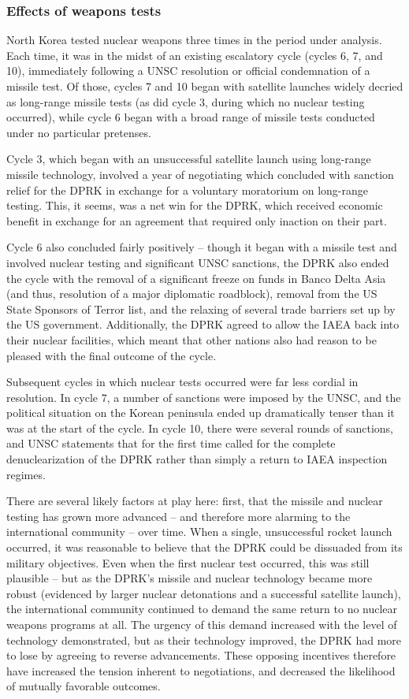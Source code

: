 \documentclass{article}
\begin{document}
\subsubsection{Effects of weapons tests}
North Korea tested nuclear weapons three times in the period under analysis. Each time, it was in the midst of an existing escalatory cycle (cycles 6, 7, and 10), immediately following a UNSC resolution or official condemnation of a missile test. Of those, cycles 7 and 10 began with satellite launches widely decried as long-range missile tests (as did cycle 3, during which no nuclear testing occurred), while cycle 6 began with a broad range of missile tests conducted under no particular pretenses.

Cycle 3, which began with an unsuccessful satellite launch using long-range missile technology, involved a year of negotiating which concluded with sanction relief for the DPRK in exchange for a voluntary moratorium on long-range testing. This, it seems, was a net win for the DPRK, which received economic benefit in exchange for an agreement that required only inaction on their part.

Cycle 6 also concluded fairly positively – though it began with a missile test and involved nuclear testing and significant UNSC sanctions, the DPRK also ended the cycle with the removal of a significant freeze on funds in Banco Delta Asia (and thus, resolution of a major diplomatic roadblock), removal from the US State Sponsors of Terror list, and the relaxing of several trade barriers set up by the US government. Additionally, the DPRK agreed to allow the IAEA back into their nuclear facilities, which meant that other nations also had reason to be pleased with the final outcome of the cycle.

Subsequent cycles in which nuclear tests occurred were far less cordial in resolution. In cycle 7, a number of sanctions were imposed by the UNSC, and the political situation on the Korean peninsula ended up dramatically tenser than it was at the start of the cycle. In cycle 10, there were several rounds of sanctions, and UNSC statements that for the first time called for the complete denuclearization of the DPRK rather than simply a return to IAEA inspection regimes.

There are several likely factors at play here: first, that the missile and nuclear testing has grown more advanced – and therefore more alarming to the international community – over time. When a single, unsuccessful rocket launch occurred, it was reasonable to believe that the DPRK could be dissuaded from its military objectives. Even when the first nuclear test occurred, this was still plausible – but as the DPRK’s missile and nuclear technology became more robust (evidenced by larger nuclear detonations and a successful satellite launch), the international community continued to demand the same return to no nuclear weapons programs at all. The urgency of this demand increased with the level of technology demonstrated, but as their technology improved, the DPRK had more to lose by agreeing to reverse advancements. These opposing incentives therefore have increased the tension inherent to negotiations, and decreased the likelihood of mutually favorable outcomes.
\end{document}

